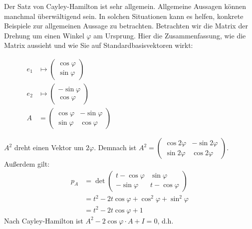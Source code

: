 \begin{bsp}
	Der Satz von Cayley-Hamilton ist sehr allgemein. Allgemeine Aussagen können  manchmal überwältigend sein. In solchen Situationen kann es helfen, konkrete Beispiele zur allgemeinen Aussage zu betrachten. Betrachten wir die Matrix der Drehung um einen Winkel $\varphi$ am Ursprung. Hier die Zusammenfassung, wie die Matrix aussieht und wie Sie auf Standardbasisvektoren wirkt: 
	\begin{figure}[H]
		\centering
		\begin{minipage}{0.35\textwidth}
			\centering
			
		\end{minipage}
		\begin{minipage}{0.55\textwidth}
			\centering
			$ \begin{aligned}
				e_1 &\mapsto \begin{pmatrix} \cos \varphi \\ \sin \varphi \end{pmatrix} 
				\\ 
				e_2 &\mapsto \begin{pmatrix} -\sin \varphi \\ \cos \varphi \end{pmatrix} \\
				A &= \begin{pmatrix}
					\cos \varphi & -\sin \varphi \\
					\sin \varphi & \cos \varphi
				\end{pmatrix}
			\end{aligned} $
		\end{minipage}
	\end{figure}
	\noindent $ A^2 $ dreht einen Vektor um $ 2\varphi $. Demnach ist $ A^2 = \begin{pmatrix}
		\cos 2\varphi & -\sin 2\varphi \\
		\sin 2\varphi & \cos 2\varphi
	\end{pmatrix} $. Außerdem gilt:
	\begin{align*}
		p_A &= \det \begin{pmatrix}
			t - \cos \varphi & \sin \varphi \\
			-\sin \varphi & t - \cos \varphi
		\end{pmatrix} \\
		&= t^2 - 2t \cos \varphi + \cos^2 \varphi + \sin^2 \varphi \\
		&= t^2 - 2t \cos \varphi + 1
	\end{align*}
	Nach Cayley-Hamilton ist $ A^2 - 2 \cos \varphi \cdot A + I = 0 $, d.h.

\end{bsp}
